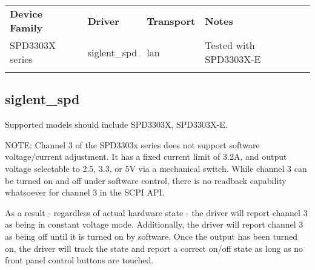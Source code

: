 \begin{tabularx}{16cm}{lllX}
\thickhline
\textbf{Device Family} & \textbf{Driver} & \textbf{Transport} & \textbf{Notes} \\
\thickhline
SPD3303X series & siglent\_spd & lan & Tested with SPD3303X-E\\
\thickhline
\end{tabularx}

\subsection{siglent\_spd}

Supported models should include SPD3303X, SPD3303X-E.

NOTE: Channel 3 of the SPD3303x series does not support software voltage/current adjustment. It has a fixed current
limit of 3.2A, and output voltage selectable to 2.5, 3.3, or 5V via a mechanical switch. While channel 3 can be turned
on and off under software control, there is no readback capability whatsoever for channel 3 in the SCPI API.

As a result - regardless of actual hardware state - the driver will report channel 3 as being in constant voltage mode.
Additionally, the driver will report channel 3 as being off until it is turned on by software. Once the output has been
turned on, the driver will track the state and report a correct on/off state as long as no front panel control buttons
are touched.
